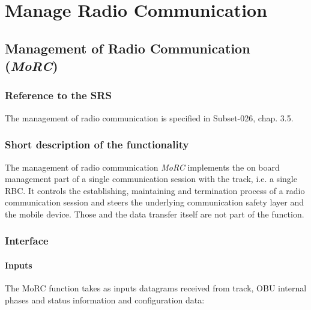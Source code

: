 
\section{Manage Radio Communication}

\subsection{Management of Radio Communication (\emph{MoRC})} 

\subsubsection{Reference to the SRS}
The management of radio communication is specified in Subset-026, chap. 3.5. 

\subsubsection{Short description of the functionality}

The management of radio communication \textit{MoRC} implements the on board management part of a single communication session with the track, i.e. a single RBC. It controls the establishing, maintaining and termination process of a radio communication session and steers the underlying communication safety layer and the mobile device. Those and the data transfer itself are not part of the function. 

\subsubsection{Interface}

\paragraph{Inputs}
The MoRC function takes as inputs datagrams received from track, OBU internal phases and status information and configuration data: 

